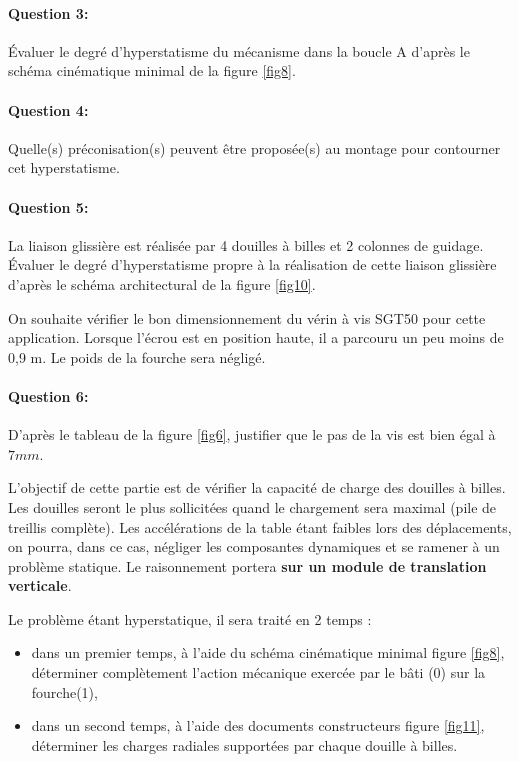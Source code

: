 \paragraph{Question 3:} Évaluer le degré d'hyperstatisme du mécanisme dans la boucle A d'après le schéma cinématique minimal de la figure \ref{fig8}.

\paragraph{Question 4:}	Quelle(s) préconisation(s) peuvent être proposée(s) au montage pour contourner cet hyperstatisme.

\paragraph{Question 5:} La liaison glissière est réalisée par 4 douilles à billes et 2 colonnes de guidage. Évaluer le degré d'hyperstatisme propre à la réalisation de cette liaison glissière d'après le schéma architectural de la figure \ref{fig10}.

On souhaite vérifier le bon dimensionnement du vérin à vis SGT50 pour cette application. Lorsque l'écrou est en position haute, il a parcouru un peu moins de 0,9 m. Le poids de la fourche sera négligé.

\paragraph{Question 6:} D'après le tableau de la figure \ref{fig6}, justifier que le pas de la vis est bien égal à $7mm$.

L'objectif de cette partie est de vérifier la capacité de charge des douilles à billes. Les douilles seront le plus sollicitées quand le chargement sera maximal (pile de treillis complète). Les accélérations de la table étant faibles lors des déplacements, on pourra, dans ce cas, négliger les composantes dynamiques et se ramener à un problème statique. Le raisonnement portera \textbf{sur un module de translation verticale}.

Le problème étant hyperstatique, il sera traité en 2 temps :
\begin{itemize}
 \item dans un premier temps, à l'aide du schéma cinématique minimal figure \ref{fig8}, déterminer complètement l'action mécanique exercée par le bâti (0) sur la fourche(1),
 \item dans un second temps, à l'aide des documents constructeurs figure \ref{fig11}, déterminer les charges radiales supportées par chaque douille à billes.
\end{itemize}

